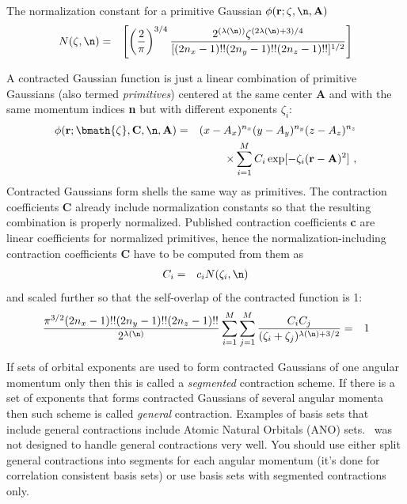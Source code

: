\documentclass[10pt]{article}
\begin{document}
The normalization constant for a primitive Gaussian $\phi ({\bf r}; \zeta, \n, {\bf A})$
\begin{eqnarray}
N(\zeta,\n) & = & \left[ \left(\frac{2}{\pi}\right)^{3/4}\frac{2^{(\lambda(\n))}\zeta^{(2\lambda(\n)+3)/4}}
                {[(2n_x-1)!!(2n_y-1)!!(2n_z-1)!!]^{1/2}} \right]
\end{eqnarray}

A contracted Gaussian function is just a linear combination of primitive Gaussians (also termed {\em primitives})
centered at the same center {\bf A} and with the same momentum indices {\bf n}
but with different exponents $\zeta_i$:
\begin{eqnarray}
\phi ({\bf r}; \bmath{\zeta}, {\bf C}, \n, {\bf A}) & = & (x - A_x)^{n_x} (y - A_y)^{n_y} (z - A_z)^{n_z} \nonumber \\
& & \times \sum_{i=1}^M C_i \exp [-\zeta_i ({\bf r}-{\bf A})^2]\ ,
\end{eqnarray}
Contracted Gaussians form shells the same way as primitives.
The contraction coefficients {\bf C} already include normalization constants so that the resulting combination
is properly normalized. Published contraction coefficients {\bf c} are linear coefficients for normalized primitives,
hence the normalization-including contraction coefficients {\bf C} have to be computed from them as
\begin{eqnarray} \label{eq:C1}
C_i & = & c_i N(\zeta_i,\n)
\end{eqnarray}
and scaled further so that the self-overlap of the contracted function is 1:
\begin{eqnarray} \label{eq:C2}
\frac{\pi^{3/2} (2n_x-1)!!(2n_y-1)!!(2n_z-1)!!}{2^{\lambda(\n)}}
\sum_{i=1}^M \sum_{j=1}^M \frac{C_i C_j }{(\zeta_i+\zeta_j)^{\lambda(\n)+3/2}} & = & 1
\end{eqnarray}

If sets of orbital exponents are used to form contracted Gaussians of one angular momentum only
then this is called a {\em segmented} contraction scheme. If there is a set of exponents that forms
contracted Gaussians of several angular momenta then such scheme is called {\em general} contraction.
Examples of basis sets that include general contractions include Atomic Natural Orbitals (ANO) sets.
\LIBINT\ was not designed to handle general contractions very well. You should use either split general contractions
into segments for each angular momentum (it's done for correlation consistent basis sets)
or use basis sets with segmented contractions only.
\end{document}
